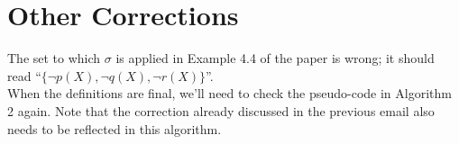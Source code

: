 \documentclass{llncs}
\begin{document}
\section{Other Corrections}

The set to which $\sigma$ is applied in Example 4.4 of the paper is wrong; it should read ``$\{\lnot p(X),\lnot q(X),\lnot r(X)\}$''.\\

\noindent
When the definitions are final, we'll need to check the pseudo-code in Algorithm 2 again. Note that the correction already discussed in the previous email also needs to be reflected in this algorithm.

\begin{footnotesize}
%


\end{footnotesize}
\end{document}
